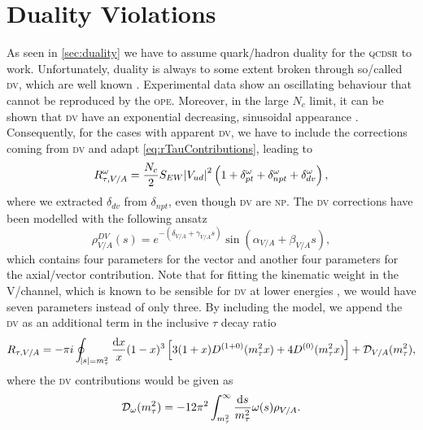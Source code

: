 \documentclass[../../index.tex]{subfiles}
\begin{document}
\section{Duality Violations}
As seen in \cref{sec:duality} we have to assume quark\-/hadron duality for the
\textsc{qcdsr} to work. Unfortunately, duality is always to some extent broken
through so\-/called \textsc{dv}, which are well known \cite{Cata2008,Cata2009}.
Experimental data show an oscillating behaviour that cannot be reproduced by the
\textsc{ope}. Moreover, in the large \(N_c\) limit, it can be shown that
\textsc{dv} have an exponential decreasing, sinusoidal appearance
\cite{Cata2005}. Consequently, for the cases with apparent \textsc{dv}, we have
to include the corrections coming from \textsc{dv} and adapt
\cref{eq:rTauContributions}, leading to
\begin{equation}
  R_{\tau,V/A}^\omega = \frac{N_c}{2}S_{EW} \abs{V_{ud}}^2 \left( 1 + \delta_{pt}^{\omega} + \delta_{npt}^{\omega} + \delta_{dv}^{\omega} \right),
\end{equation}
where we extracted \(\delta_{dv}\) from \(\delta_{npt}\), even though
\textsc{dv} are \textsc{np}. The \textsc{dv} corrections have been modelled with
the following ansatz \cite{Cata2009}
\begin{equation}
  \label{eq:dvModel}
  \rho_{V/A}^{DV}(s) = e^{-(\delta_{V/A}+\gamma_{V/A}s)} \sin(\alpha_{V/A} + \beta_{V/A}s),
\end{equation}
which contains four parameters for the vector and another four parameters for
the axial\-/vector contribution. Note that for fitting the kinematic weight in
the \textsc{V}\-/channel, which is known to be sensible for \textsc{dv} at lower
energies \cite{Boito2011a}, we would have seven parameters instead of only
three. By including the model, we append the \textsc{dv} as an additional term
in the inclusive \(\tau\) decay ratio
\begin{equation}
  R_{\tau,V/A} = - \pi i \oint_{\abs{s}=m_\tau^2} \frac{\dif x}{x} (1 - x)^3 \left[ 3
    (1 + x) D^{(1+0)}(m_\tau^2 x) + 4 D^{(0)}(m_\tau^2 x) \right] +  \mathcal{D}_{V/A}(m_\tau^2),
\end{equation}
where the \textsc{dv} contributions would be given as
\begin{equation}
  \mathcal{D}_\omega(m_\tau^2) = -12 \pi^2 \int_{m_\tau^2}^\infty \frac{\dif s}{m_\tau^2} \omega(s) \rho_{V/A}.
\end{equation}
\end{document}
